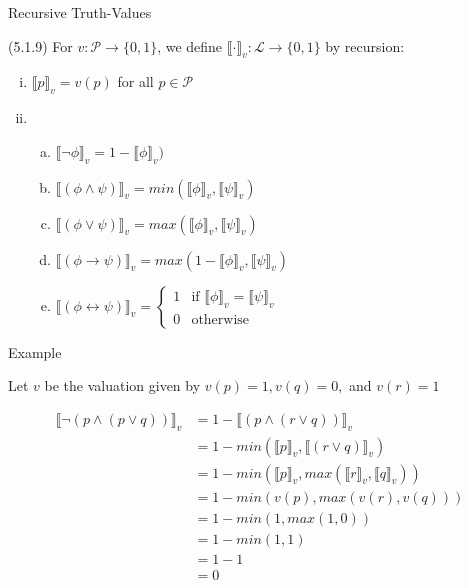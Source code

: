 \begin{frame}{Recursive Truth-Values}

(5.1.9) For $v:\mathcal{P}\to\{0,1\}$, we define $\llbracket\cdot\rrbracket_v:\mathcal{L}\to\{0,1\}$ by recursion:

\begin{enumerate}[(i)]
		
			\item  $\llbracket p\rrbracket_v=v(p)$ for all $p\in\mathcal{P}$
			
			\item \begin{enumerate}[(a)]
			
				\item  $\llbracket\neg \phi\rrbracket_v=1-\llbracket\phi\rrbracket_v)$
				
				\item  $\llbracket(\phi\land \psi)\rrbracket_v=min(\llbracket\phi\rrbracket_v, \llbracket\psi\rrbracket_v)$
				\item[] $\llbracket(\phi\lor \psi)\rrbracket_v=max(\llbracket\phi\rrbracket_v, \llbracket\psi\rrbracket_v)$		
				\item[] $\llbracket(\phi\to \psi)\rrbracket_v=max(1-\llbracket\phi\rrbracket_v, \llbracket\psi\rrbracket_v)$		
				
				\item[] $\llbracket(\phi\leftrightarrow \psi)\rrbracket_v=\begin{cases} 1 & \text{if } \llbracket\phi\rrbracket_v=\llbracket\psi\rrbracket_v\\0&\text{otherwise}\end{cases}$		
	
			\end{enumerate}			
		\end{enumerate}


\end{frame}

\begin{frame}{Example}

Let $v$ be the valuation given by $v(p)=1,v(q)=0,$ and $v(r)=1$

\begin{align*}
		\llbracket \neg (p\land (p\lor q))\rrbracket_v &=1-\llbracket (p\land (r\lor q))\rrbracket_v\tag{ii.a}\\
		&=1-min(\llbracket p\rrbracket_v, \llbracket (r\lor q)\rrbracket_v)\tag{ii.b}\\
		&=1-min(\llbracket p\rrbracket_v, max(\llbracket r\rrbracket_v,\llbracket q\rrbracket_v))\tag{ii.b}\\
		&=1-min(v(p), max(v(r), v(q)))\tag{i}\\
		&=1-min(1, max(1,0))\tag{given}\\
		&=1-min(1,1)\\
		&=1-1\\
		&=0
		\end{align*}

\end{frame}

